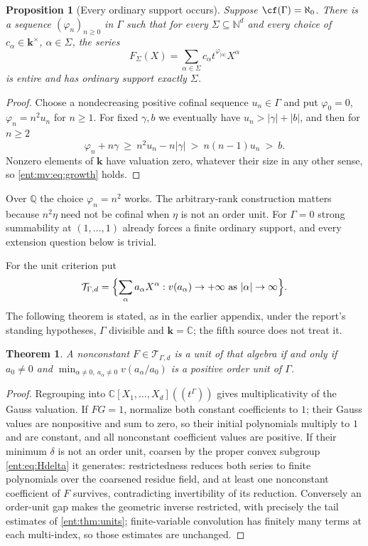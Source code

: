 \documentclass[11pt]{article}
\newtheorem{theorem}{Theorem}[section]
\theoremstyle{plain}
\theoremstyle{plain}
\newtheorem{proposition}[proposition]{Proposition}
\theoremstyle{plain}
\theoremstyle{definition}
\theoremstyle{definition}
\theoremstyle{definition}
\theoremstyle{definition}
\theoremstyle{remark}
\newcommand{\C}{\mathbb C}\newcommand{\R}{\mathbb R}
\newcommand{\Q}{\mathbb Q}\newcommand{\Z}{\mathbb Z}\newcommand{\N}{\mathbb N}
\newcommand{\kk}{\mathbf k}\newcommand{\PP}{\mathbb P}
\begin{document}
\begin{proposition}[Every ordinary support occurs]
\label{ent:mv:prop:realize-support}
Suppose $\cf(\Gamma)=\aleph_0$. There is a sequence $(\varphi_n)_{n\ge0}$ in
$\Gamma$ such that for every $\Sigma\subseteq\N^d$ and every choice of
$c_\alpha\in\kk^\times$, $\alpha\in\Sigma$, the series
\[
 F_\Sigma(X)=\sum_{\alpha\in\Sigma}c_\alpha t^{\varphi_{|\alpha|}}X^\alpha
\]
is entire and has ordinary support exactly $\Sigma$.
\end{proposition}
\begin{proof}
Choose a nondecreasing positive cofinal sequence $u_n\in\Gamma$ and put
$\varphi_0=0$, $\varphi_n=n^2u_n$ for $n\ge1$. For fixed $\gamma,b$ we
eventually have $u_n>|\gamma|+|b|$, and then for $n\ge2$
\[
 \varphi_n+n\gamma\ \ge\ n^2u_n-n|\gamma|\ >\ n(n-1)u_n\ >\ b .
\]
Nonzero elements of $\kk$ have valuation zero, whatever their size in any
other sense, so \eqref{ent:mv:eq:growth} holds.
\end{proof}

Over $\Q$ the choice $\varphi_n=n^2$ works. The arbitrary-rank construction
matters because $n^2\eta$ need not be cofinal when $\eta$ is not an order
unit. For $\Gamma=0$ strong summability at $(1,\ldots,1)$ already forces a
finite ordinary support, and every extension question below is trivial.

For the unit criterion put
\[
 \mathcal T_{\Gamma,d}
 =\Bigl\{\sum_\alpha a_\alpha X^\alpha:
              v(a_\alpha)\to+\infty\text{ as }|\alpha|\to\infty\Bigr\}.
\]
The following theorem is stated, as in the earlier appendix, under the
report's standing hypotheses, $\Gamma$ divisible and $\kk=\C$; the fifth
source does not treat it.

\begin{theorem}\label{ent:thm:multi-unit}
A nonconstant $F\in\mathcal T_{\Gamma,d}$ is a unit of that algebra if and
only if $a_0\ne0$ and
$\min_{\alpha\ne0,\ a_\alpha\ne0}v(a_\alpha/a_0)$ is a positive order unit of
$\Gamma$.
\end{theorem}
\begin{proof}
Regrouping into $\C[X_1,\ldots,X_d]((t^\Gamma))$ gives multiplicativity of
the Gauss valuation. If $FG=1$, normalize both constant coefficients to $1$;
their Gauss values are nonpositive and sum to zero, so their initial
polynomials multiply to $1$ and are constant, and all nonconstant coefficient
values are positive. If their minimum $\delta$ is not an order unit, coarsen
by the proper convex subgroup \eqref{ent:eq:Hdelta} it generates:
restrictedness reduces both series to finite polynomials over the coarsened
residue field, and at least one nonconstant coefficient of $F$ survives,
contradicting invertibility of its reduction. Conversely an order-unit gap
makes the geometric inverse restricted, with precisely the tail estimates of
\cref{ent:thm:units}; finite-variable convolution has finitely many terms at
each multi-index, so those estimates are unchanged.
\end{proof}
\end{document}
